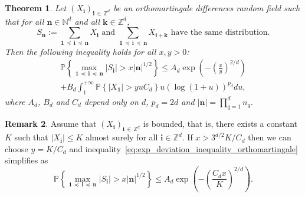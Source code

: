 \documentclass[10pt]{amsart}
\newtheorem{theo}{Theorem}[section]
\theoremstyle{definition}\newtheorem{defi}[theo]{Definition}\newtheorem{rema}[theo]{Remark}\newtheorem{exam}[theo]{Example}\newtheorem{exem}[theo]{Example}\newtheorem{nota}[theo]{Notation}
\newcommand\N{\mathbb{N}}
\newcommand\PP{\mathbb{P}}
\newcommand\Z{\mathbb{Z}}
\newcommand\abs[1]{|#1|}
\newcommand{\pr}[1]{(#1)}
\newcommand{\gr}[1]{\bm{#1}}
\newcommand{\gri}{\bm{i}}
\newcommand{\grn}{\bm{n}}
\newcommand{\grk}{\bm{k}}
\newcommand{\imd}{\preccurlyeq}
\begin{document}
\begin{theo}\label{thm:deviation_inequality_orthomartingale}
Let $\pr{X_{\gri}}_{\gri\,\in\,\Z^d}$ be an orthomartingale differences random field such that for all $\grn\in\N^d$ and all $\grk\in\Z^d$,
\begin{equation}\label{eq:invariance_loi_sommes}
S_{\grn}:=\sum_{\gr{1}\,\imd\,\gri\,\imd\,\grn} X_{\gri}\text{ and } \sum_{\gr{1}\,\imd\,\gri\,\imd\,\grn} X_{\gri+\grk}\text{ have the same distribution}.
\end{equation}
Then the following inequality holds for all $x,y>0$:
\begin{multline}\label{eq:exp_deviation_inequality_orthomartingale}
\PP\left\{\max_{\gr{1}\,\imd\,\gri\,\imd\,\gr{n}} \left|S_{\gri} \right| >x\left|\grn\right|^{1/2}\right\}\leq A_d\exp\left(-\left(\frac{x}{y}\right)^{2/d}\right)
\\+B_d\int_1^{+\infty}\PP\left\{\left|X_{\gr{1}}\right|>yuC_d\right\} u\left(\log\pr{1+u}\right)^{p_d}du,
\end{multline}
where $A_d$, $B_d$ and $C_d$ depend only on $d$, $p_d=2d$ and $\abs{\grn}=\prod_{q=1}^dn_q$.
\end{theo}

\begin{rema}
Assume that $\pr{X_{\gri}}_{\gri\,\in\,\Z^d}$ is bounded, that is, there exists a constant $K$ such that $\abs{X_{\gr{i}}}\leq K$ almost surely for all $\gri\in\Z^d$. If $x>3^{d/2}K/C_d$ then we can choose $y=K/C_d$ and inequality~\eqref{eq:exp_deviation_inequality_orthomartingale} simplifies as
\begin{equation}
\PP\left\{\max_{\gr{1}\,\imd\,\gri\,\imd\,\gr{n}} \left|S_{\gri} \right| >x\left|\grn\right|^{1/2}\right\}\leq A_d\exp\left(-\left(\frac{C_dx}{K}\right)^{2/d}\right).
\end{equation}
\end{rema}
\end{document}
